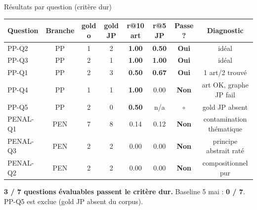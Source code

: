 \documentclass[aspectratio=169,10pt]{beamer}
\newcommand{\okbox}[1]{%
  \begin{center}
  \colorbox{green!10}{\parbox{0.92\linewidth}{\centering #1}}
  \end{center}}
\begin{document}
\begin{frame}{Résultats par question (critère dur)}
  \footnotesize
  \renewcommand{\arraystretch}{1.2}
  \begin{tabular}{@{}l c c c c c c c@{}}
    \toprule
    \textbf{Question} & \textbf{Branche} & \textbf{gold o} & \textbf{gold JP} &
    \textbf{r@10 art} & \textbf{r@5 JP} & \textbf{Passe ?} & \textbf{Diagnostic} \\
    \midrule
    PP-Q2 & \textcolor{ppcol}{PP} & 1 & 2 & \textbf{1.00} & \textbf{0.50} & \textcolor{ok}{\textbf{Oui}} & idéal \\
    PP-Q3 & \textcolor{ppcol}{PP} & 2 & 1 & \textbf{1.00} & \textbf{1.00} & \textcolor{ok}{\textbf{Oui}} & idéal \\
    PP-Q1 & \textcolor{ppcol}{PP} & 2 & 3 & \textbf{0.50} & \textbf{0.67} & \textcolor{ok}{\textbf{Oui}} & 1 art/2 trouvé \\
    PP-Q4 & \textcolor{ppcol}{PP} & 1 & 1 & \textbf{1.00} & 0.00 & \textcolor{warn}{\textbf{Non}} & art OK, graphe JP fail \\
    PP-Q5 & \textcolor{ppcol}{PP} & 2 & 0 & \textbf{0.50} & n/a & \textcolor{warn}{$\circ$} & gold JP absent \\
    PENAL-Q1 & \textcolor{penalcol}{PEN} & 7 & 8 & 0.14 & 0.12 & \textcolor{warn}{\textbf{Non}} & contamination thématique \\
    PENAL-Q3 & \textcolor{penalcol}{PEN} & 2 & 2 & 0.00 & 0.00 & \textcolor{warn}{\textbf{Non}} & principe abstrait raté \\
    PENAL-Q2 & \textcolor{penalcol}{PEN} & 2 & 2 & 0.00 & 0.00 & \textcolor{warn}{\textbf{Non}} & compositionnel pur \\
    \bottomrule
  \end{tabular}

  \vspace{0.8em}
  \okbox{\textbf{3 / 7 questions évaluables passent le critère dur.}
  Baseline 5 mai : \textbf{0 / 7}. PP-Q5 est exclue (gold JP absent du corpus).}
\end{frame}
\end{document}
